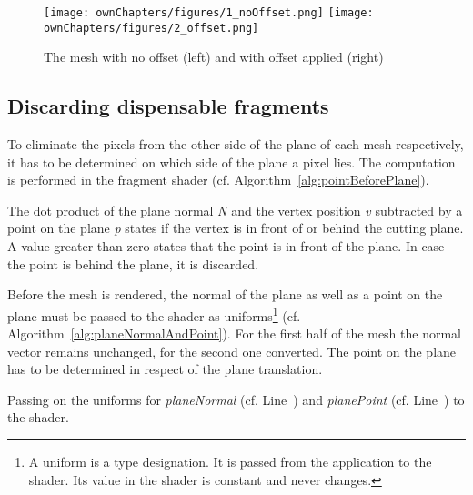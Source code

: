 \begin{figure}%
\centering
\texttt{[image: ownChapters/figures/1\_noOffset.png]}%
\hspace{7.00mm}
\texttt{[image: ownChapters/figures/2\_offset.png]}%
\caption{The mesh with no offset (left) and with offset applied (right)}%
\label{fig:offset}%
\end{figure}

\subsection{Discarding dispensable fragments}
To eliminate the pixels from the other side of the plane of each mesh respectively, it has to be determined on which side of the plane a pixel lies. The computation is performed in the fragment shader (cf. Algorithm~\ref{alg:pointBeforePlane}).

\begin{algorithm}
 {\;}
\caption{The dot product of the plane normal \emph{N} and the vertex position \emph{v} subtracted by a point on the plane \emph{p} states if the vertex is in front of or behind the cutting plane. A value greater than zero states that the point is in front of the plane. In case the point is behind the plane, it is discarded.}
\BlankLine
\label{alg:pointBeforePlane}
\end{algorithm}

Before the mesh is rendered, the normal of the plane as well as a point on the plane must be passed to the shader as uniforms\footnote{A uniform is a type designation. It is passed from the application to the shader. Its value in the shader is constant and never changes.} (cf. Algorithm~\ref{alg:planeNormalAndPoint}). For the first half of the mesh the normal vector remains unchanged, for the second one converted. The point on the plane has to be determined in respect of the plane translation.
\LinesNumbered
\begin{algorithm}
\;\label{ln:planeN}
\;\label{ln:planeP}
\BlankLine
\caption{Passing on the uniforms for \emph{planeNormal} (cf. Line~\NlSty{\ref{ln:planeN}}) and \emph{planePoint} (cf. Line~\NlSty{\ref{ln:planeP}}) to the shader.}
\label{alg:planeNormalAndPoint}
\end{algorithm}
\LinesNotNumbered

